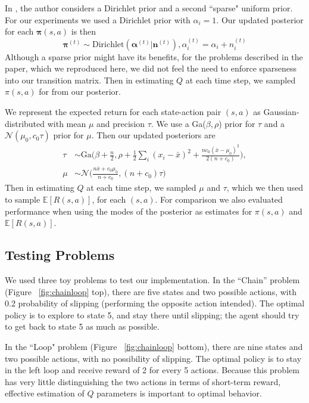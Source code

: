 \documentclass[10pt, twocolumn, twoside]{article}
\begin{document}
In \cite{strens}, the author considers a Dirichlet prior and a second ``sparse"
uniform prior. For our experiments we used a Dirichlet prior with $\alpha_i = 1$.
Our updated posterior for each $\mathbf{\pi}(s, a)$ is then
\begin{equation*}
\mathbf{\pi}^{(t)} \sim \textrm{Dirichlet}(\mathbf{\alpha}^{(t)}| \mathbf{n}^{(t)}),
\alpha^{(t)}_i = \alpha_i + n_i^{(t)}
\end{equation*}
Although a sparse prior might have its benefits, for the problems described in the paper,
which we reproduced here, we did not feel the need to enforce sparseness into our
transition matrix. Then in estimating $Q$ at each time step, we sampled $\pi(s, a)$ for
from our posterior.

We represent the expected return for each state-action pair $(s, a)$ as Gaussian-
distributed with mean $\mu$ and precision $\tau$. We use a Ga($\beta,\rho$)
prior for $\tau$ and a $\mathcal{N}(\mu_0, c_0\tau)$ prior for $\mu$. Then our
updated posteriors are
\begin{align*}
\tau &\sim \textrm{Ga}\Big(\beta + \frac{n}{2}, \rho + \frac{1}{2}\sum_i(x_i - \bar{x})^2
+ \frac{nc_0(\bar{x}-\mu_0)^2}{2(n+c_0)}\Big),\\
\mu &\sim \mathcal{N}\Big(\frac{n\bar{x} + c_0\mu_0}{n + c_0}, (n+c_0)\tau\Big)
\end{align*}
Then in estimating $Q$ at each time step, we sampled $\mu$ and $\tau$, which we then used
to sample $\mathbb{E}[R(s, a)]$, for each $(s, a)$.
For comparison we also evaluated performance when using the modes of the posterior as
estimates for $\pi(s, a)$ and $\mathbb{E}[R(s,a)]$.

\subsection{Testing Problems}
We used three toy problems to test our implementation. In the ``Chain'' problem
(Figure ~\ref{fig:chainloop} top), there are five states and two possible actions, with 0.2
probability of slipping (performing the opposite action intended). The optimal
policy is to explore to state 5, and stay there until slipping; the agent should try
to get back to state 5 as much as possible.

In the ``Loop" problem (Figure ~\ref{fig:chainloop} bottom), there are nine states and
two possible actions, with no possibility of slipping. The optimal policy is to stay
in the left loop and receive reward of 2 for every 5 actions. Because this problem has
very little distinguishing the two actions in terms of short-term reward, effective
estimation of $Q$ parameters is important to optimal behavior.
\end{document}
